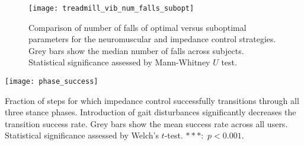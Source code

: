 \begin{figure}[h]
    \centering 
    \texttt{[image: treadmill\_vib\_num\_falls\_subopt]}
    \caption{Comparison of number of falls of optimal versus suboptimal
    parameters for the neuromuscular and impedance control strategies. Grey bars
    show the median number of falls across subjects. Statistical significance
    assessed by Mann-Whitney $U$
    test.}\label{fig:treadmill_exp_num_falls_subopt}
\end{figure}

\begin{marginfigure}
    \centering 
    \texttt{[image: phase\_success]}
    \caption{Fraction of steps for which impedance control successfully
    transitions through all three stance phases. Introduction of gait
    disturbances significantly decreases the transition success rate. Grey bars
    show the mean success rate across all users. Statistical significance
    assessed by Welch's $t$-test. $***$:~$p <
    0.001$.}\label{fig:treadmill_exp_phase_success}
\end{marginfigure}
